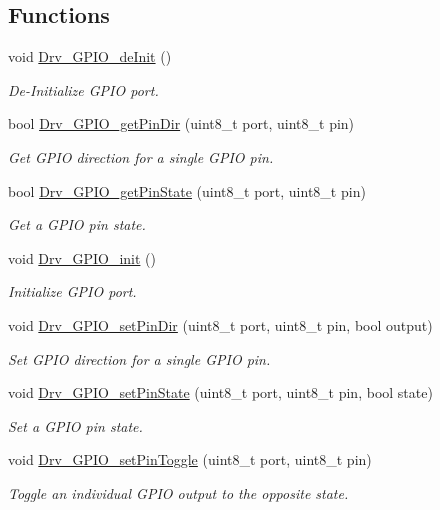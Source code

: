 \subsection*{Functions}
\begin{DoxyCompactItemize}
\item 
void \hyperlink{group__GPIO__Library_gabfa3c7c5fbe5f6cc90ef6e78b2051c49}{Drv\+\_\+\+G\+P\+I\+O\+\_\+de\+Init} ()
\begin{DoxyCompactList}\small\item\em De-\/\+Initialize G\+P\+IO port. \end{DoxyCompactList}\item 
bool \hyperlink{group__GPIO__Library_gad767589a46bc6f6781d3572f68a71f1c}{Drv\+\_\+\+G\+P\+I\+O\+\_\+get\+Pin\+Dir} (uint8\+\_\+t port, uint8\+\_\+t pin)
\begin{DoxyCompactList}\small\item\em Get G\+P\+IO direction for a single G\+P\+IO pin. \end{DoxyCompactList}\item 
bool \hyperlink{group__GPIO__Library_ga3979c4c389440c603c44afef9b25c6c6}{Drv\+\_\+\+G\+P\+I\+O\+\_\+get\+Pin\+State} (uint8\+\_\+t port, uint8\+\_\+t pin)
\begin{DoxyCompactList}\small\item\em Get a G\+P\+IO pin state. \end{DoxyCompactList}\item 
void \hyperlink{group__GPIO__Library_ga9be5db131ab65deac64ba3f32adc3e0a}{Drv\+\_\+\+G\+P\+I\+O\+\_\+init} ()
\begin{DoxyCompactList}\small\item\em Initialize G\+P\+IO port. \end{DoxyCompactList}\item 
void \hyperlink{group__GPIO__Library_gab513ddd38bb6f89dfa844fd7ab6c48dd}{Drv\+\_\+\+G\+P\+I\+O\+\_\+set\+Pin\+Dir} (uint8\+\_\+t port, uint8\+\_\+t pin, bool output)
\begin{DoxyCompactList}\small\item\em Set G\+P\+IO direction for a single G\+P\+IO pin. \end{DoxyCompactList}\item 
void \hyperlink{group__GPIO__Library_gaa0fc19aa74a1bf75817ba137e78f7a0a}{Drv\+\_\+\+G\+P\+I\+O\+\_\+set\+Pin\+State} (uint8\+\_\+t port, uint8\+\_\+t pin, bool state)
\begin{DoxyCompactList}\small\item\em Set a G\+P\+IO pin state. \end{DoxyCompactList}\item 
void \hyperlink{group__GPIO__Library_ga240d6ad540b4d4cc042ea7a3a5746159}{Drv\+\_\+\+G\+P\+I\+O\+\_\+set\+Pin\+Toggle} (uint8\+\_\+t port, uint8\+\_\+t pin)
\begin{DoxyCompactList}\small\item\em Toggle an individual G\+P\+IO output to the opposite state. \end{DoxyCompactList}\end{DoxyCompactItemize}


